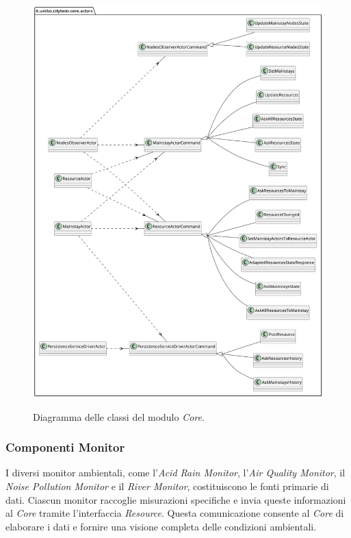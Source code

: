 \documentclass{scrartcl}
\begin{document}
\begin{figure}[H]
    \caption{Diagramma delle classi del modulo \textit{Core}.}
    \includegraphics[width=\textwidth]{../assets/images/core-class-diagram.png}
    \label{fig:core-class-diagram}
\end{figure}

\subsubsection{Componenti Monitor}
I diversi monitor ambientali, come l'\textit{Acid Rain Monitor}, l'\textit{Air Quality Monitor}, il \textit{Noise Pollution Monitor} e il \textit{River Monitor}, costituiscono le fonti primarie di dati. Ciascun monitor raccoglie misurazioni specifiche e invia queste informazioni al \textit{Core} tramite l'interfaccia \textit{Resource}. Questa comunicazione consente al \textit{Core} di elaborare i dati e fornire una visione completa delle condizioni ambientali.
\end{document}
